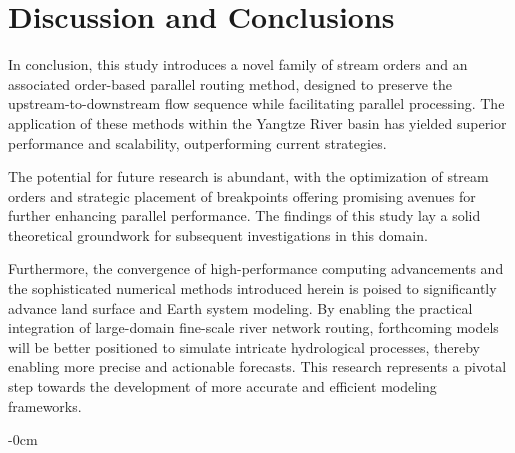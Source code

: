 \documentclass[water,article,submit,pdftex,moreauthors]{Definitions/mdpi}
\begin{document}
\section{Discussion and Conclusions}
\label{sec:conclusions}

In conclusion, this study introduces a novel family of stream orders and an associated order-based parallel routing method, designed to preserve the upstream-to-downstream flow sequence while facilitating parallel processing. The application of these methods within the Yangtze River basin has yielded superior performance and scalability, outperforming current strategies.

The potential for future research is abundant, with the optimization of stream orders and strategic placement of breakpoints offering promising avenues for further enhancing parallel performance. The findings of this study lay a solid theoretical groundwork for subsequent investigations in this domain.

Furthermore, the convergence of high-performance computing advancements and the sophisticated numerical methods introduced herein is poised to significantly advance land surface and Earth system modeling. By enabling the practical integration of large-domain fine-scale river network routing, forthcoming models will be better positioned to simulate intricate hydrological processes, thereby enabling more precise and actionable forecasts. This research represents a pivotal step towards the development of more accurate and efficient modeling frameworks.

\vspace{6pt}






\begin{adjustwidth}{-\extralength}{0cm}


	

	\PublishersNote{}
\end{adjustwidth}
\end{document}
